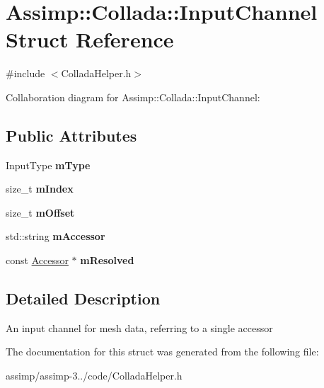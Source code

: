 \hypertarget{struct_assimp_1_1_collada_1_1_input_channel}{\section{Assimp\+:\+:Collada\+:\+:Input\+Channel Struct Reference}
\label{struct_assimp_1_1_collada_1_1_input_channel}
}


{\ttfamily \#include $<$Collada\+Helper.\+h$>$}



Collaboration diagram for Assimp\+:\+:Collada\+:\+:Input\+Channel\+:
\subsection*{Public Attributes}
\begin{DoxyCompactItemize}
\item 
\hypertarget{struct_assimp_1_1_collada_1_1_input_channel_ae73d4a6c95a8c958b9ebbb6788461e08}{Input\+Type {\bfseries m\+Type}}\label{struct_assimp_1_1_collada_1_1_input_channel_ae73d4a6c95a8c958b9ebbb6788461e08}

\item 
\hypertarget{struct_assimp_1_1_collada_1_1_input_channel_ac088604faba86b996dbcac6806cf5f96}{size\+\_\+t {\bfseries m\+Index}}\label{struct_assimp_1_1_collada_1_1_input_channel_ac088604faba86b996dbcac6806cf5f96}

\item 
\hypertarget{struct_assimp_1_1_collada_1_1_input_channel_a1e77df53a73a8d51d9ea0bbeda4b47dc}{size\+\_\+t {\bfseries m\+Offset}}\label{struct_assimp_1_1_collada_1_1_input_channel_a1e77df53a73a8d51d9ea0bbeda4b47dc}

\item 
\hypertarget{struct_assimp_1_1_collada_1_1_input_channel_a180be3c05f1faa3b38af587ad39a10e0}{std\+::string {\bfseries m\+Accessor}}\label{struct_assimp_1_1_collada_1_1_input_channel_a180be3c05f1faa3b38af587ad39a10e0}

\item 
\hypertarget{struct_assimp_1_1_collada_1_1_input_channel_a22fda3e7e20c32ec738b281a39dcaa5f}{const \hyperlink{struct_assimp_1_1_collada_1_1_accessor}{Accessor} $\ast$ {\bfseries m\+Resolved}}\label{struct_assimp_1_1_collada_1_1_input_channel_a22fda3e7e20c32ec738b281a39dcaa5f}

\end{DoxyCompactItemize}


\subsection{Detailed Description}
An input channel for mesh data, referring to a single accessor 

The documentation for this struct was generated from the following file\+:\begin{DoxyCompactItemize}
\item 
assimp/assimp-\/3../code/Collada\+Helper.\+h\end{DoxyCompactItemize}
